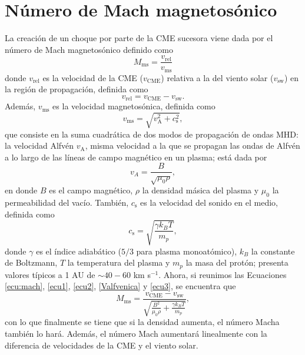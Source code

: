 \chapter{Número de Mach magnetosónico}
\label{Mach}
La creación de un choque por parte de la CME sucesora viene dada por el número de Mach magnetosónico definido como
\begin{equation}
M_\text{ms}=\frac{v_{\text{rel}}}{v_{\text{ms}}}
\label{ecu:mach}
\end{equation}
donde $v_{\text{rel}}$ es la velocidad de la CME ($v_{\text{CME}}$) relativa a la del viento solar ($v_{\text{sw}}$) en la región de propagación, definida como
\begin{equation}
v_{\text{rel}}=v_{\text{CME}}-v_{\text{sw}}.
\label{ecu1}
\end{equation}
Además, $v_{\text{ms}}$ es la velocidad magnetosónica, definida como 
\begin{equation}
v_{\text{ms}}=\sqrt{v_\text{A}^{2}+c^{2}_\text{s}},
\label{ecu2}
\end{equation}
que consiste en la suma cuadrática de dos modos de propagación de ondas MHD: la velocidad Alfvén $v_\text{A}$, misma velocidad a la que se propagan las ondas de Alfvén a lo largo de las líneas de campo magnético en un plasma; está dada por
\begin{equation}
    v_A=\frac{B}{\sqrt{\mu_0 \rho}},
    \label{Valfvenica}
\end{equation}
en donde $B$ es el campo magnético, $\rho$ la densidad másica del plasma y $\mu_0$ la permeabilidad del vacío. También, $c_\text{s}$ es la velocidad del sonido en el medio, definida como
\begin{equation}
c_\text{s}=\sqrt{\frac{\gamma k_B T}{m_p}},
\label{ecu3}
\end{equation}
donde $\gamma$ es el índice adiabático ($5/3$ para plasma monoatómico), $k_B$ la constante de Boltzmann, $T$ la temperatura del plasma y $m_p$ la masa del protón; presenta valores típicos a 1 AU de $\sim 40-60$ km s$^{-1}$. Ahora, si reunimos las Ecuaciones \eqref{ecu:mach}, \eqref{ecu1}, \eqref{ecu2}, \eqref{Valfvenica} y \eqref{ecu3}, se encuentra que
\begin{equation}
M_\text{ms}= \frac{v_{\text{CME}}-v_{\text{sw}}}{\sqrt{\frac{B^{2}}{\mu_0 \rho}+ \frac{\gamma k_B T}{m_p}}},
\end{equation}
con lo que finalmente se tiene que si la densidad aumenta, el número Macha también lo hará. Además, el número Mach aumentará linealmente con la diferencia de velocidades de la CME y el viento solar.

